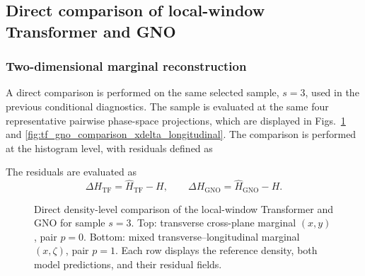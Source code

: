 \subsection{Direct comparison of local-window Transformer and GNO}
\label{subsec:results_tf_gno_comparison}

\subsubsection{Two-dimensional marginal reconstruction}
\label{subsubsec:results_tf_gno_marginals}

A direct comparison is performed on the same selected sample, $s=3$, used in the previous conditional diagnostics. The sample is evaluated at the same four representative pairwise phase-space projections, which are displayed in Figs.~\ref{fig:tf_gno_comparison_xy_xzeta} and \ref{fig:tf_gno_comparison_xdelta_longitudinal}. The comparison is performed at the histogram level, with residuals defined as   

The residuals are evaluated as
\begin{equation}
\Delta H_{\mathrm{TF}}
=
\widehat{H}_{\mathrm{TF}}-H,
\qquad
\Delta H_{\mathrm{GNO}}
=
\widehat{H}_{\mathrm{GNO}}-H.
\label{eq:tf_gno_density_residuals}
\end{equation}

\begin{figure}[p]
\centering
{}


\vspace{0.8em}


\caption{
Direct density-level comparison of the local-window Transformer and GNO for sample \(s=3\). Top: transverse cross-plane marginal \((x,y)\), pair \(p=0\). Bottom: mixed transverse--longitudinal marginal \((x,\zeta)\), pair \(p=1\). Each row displays the reference density, both model predictions, and their residual fields.
}
\label{fig:tf_gno_comparison_xy_xzeta}


\end{figure}

